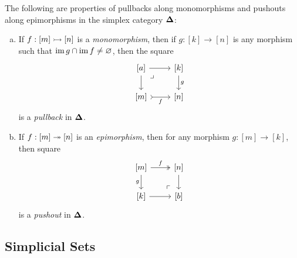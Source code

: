 \begin{lemma}
\label{lem:splx-cat-pullback-mono-pushout-epi}
The following are properties of pullbacks along monomorphisms and pushouts along
epimorphisms in the simplex category \({\mathbf{\Delta}}\):
\begin{enumerate}[(a)]\setlength\itemsep{0em}
\item If \(f: [m] \rightarrowtail [n]\) is a \emph{monomorphism}, then if \(g: [k] \to
  [n]\) is any morphism such that \(\operatorname{im} g \cap \operatorname{im} f \neq \varnothing\), then the
  square
  \[
  \begin{tikzcd}
  {[a]}  \ar[r] \ar[d] \ar[rd, phantom, very near start, "\lrcorner"]
  &{[k]} \ar[d, "g"] \\
  {[m]} \ar[r, tail, "f"'] &{[n]}
  \end{tikzcd}
  \]
  is a \emph{pullback} in \({\mathbf{\Delta}}\).
\item If \(f: [m] \twoheadrightarrow [n]\) is an \emph{epimorphism}, then for any morphism
  \(g: [m] \to [k]\), then square
  \[
  \begin{tikzcd}
  {[m]} \ar[r, two heads, "f"] \ar[d, "g"']
  \ar[dr, very near end, phantom, "\ulcorner"]
  &{[n]} \ar[d] \\
  {[k]} \ar[r] &{[b]}
  \end{tikzcd}
  \]
  is a \emph{pushout} in \({\mathbf{\Delta}}\).
\end{enumerate}
\end{lemma}



\subsection{Simplicial Sets}

